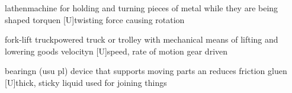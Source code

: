 \documentclass[a5paper,10pt,titlepage]{article}
\begin{document}
  {lathe}{}{n}{machine for holding and turning pieces of metal while they are being shaped}
  {torque}{}{n [U]}{twisting force causing rotation}

  {fork-lift truck}{}{}{powered truck or trolley with mechanical means of lifting and lowering goods}
  {velocity}{}{n [U]}{speed, rate of motion}
  {gear drive}{}{n}{}

  {bearing}{}{n (usu pl)}
  {device that supports moving parts an reduces friction}
  {glue}{}{n [U]}{thick, sticky liquid used for joining things}
\end{document}
